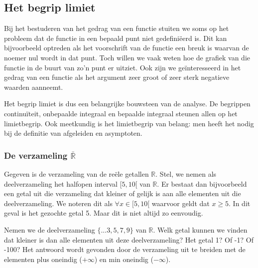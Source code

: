 
\subsection{Het begrip limiet}

Bij het bestuderen van het gedrag van een functie stuiten we soms
op het probleem dat de functie in een bepaald punt niet gedefini\"eerd
is. Dit kan bijvoorbeeld optreden als het voorschrift van de functie
een breuk is waarvan de noemer nul wordt in dat punt. Toch willen
we vaak weten hoe de grafiek van die functie in de buurt van zo'n
punt er uitziet. Ook zijn we ge\"interesseerd in het gedrag van een
functie als het argument zeer groot of zeer sterk negatieve waarden
aanneemt.

Het begrip limiet is dus een belangrijke bouwsteen van de
analyse. De begrippen continu\"iteit, onbepaalde integraal en bepaalde
integraal steunen allen op het limietbegrip. Ook meetkundig is het
limietbegrip van belang: men heeft het nodig bij de definitie van
afgeleiden en asymptoten.


\subsubsection{De verzameling $\bar{\mathbb{R}}$}

Gegeven is de verzameling van de re\"ele getallen $\mathbb{R}$. Stel,
we nemen als deelverzameling het halfopen interval $[5,10[$ van $\mathbb{R}$.
Er bestaat dan bijvoorbeeld een getal uit die verzameling dat kleiner
of gelijk is aan alle elementen uit die deelverzameling. We noteren
dit als $\forall x\in[5,10[$ waarvoor geldt dat $x\ge5$. In dit
geval is het gezochte getal 5. Maar dit is niet altijd zo eenvoudig.




Nemen we de deelverzameling $\{...3,5,7,9\}$ van $\mathbb{R}$.
Welk getal kunnen we vinden dat kleiner is dan alle elementen uit
deze deelverzameling? Het getal 1? Of -1? Of -100? Het antwoord wordt
gevonden door de verzameling uit te breiden met de elementen plus
oneindig ($+\infty$) en min oneindig ($-\infty$).




